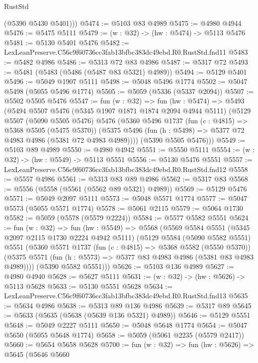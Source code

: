 \begin{lexlean}{RustStd}
\begin{coremodule}
        (@5390 @5430 @5401)))
@5474 := @5103 @83 @4989
@5475 := @4980 @4944
@5476 := @5475 @5111
@5479 := (w : @32) -> (hw : @5474) -> @5113 @5476
@5481 := @5130 @5401 @5476
@5482 := LexLeanPreserve.C56c9f60736cc3fab13bfbc383dc49ebd.R0.RustStd.fnd11
@5483 := @5482 @4986
@5486 := @5313 @72 @83 @4986
@5487 := @5317 @72
@5493 := @5481 (@5483 (@5486 (@5487 @83 @5321) @4989))
@5494 := @5129 @5401
@5496 := @5049 @1907 @5111
@5498 := @5048 @5496 @1774
@5502 := @5047 @5498 (@5055 @5496 @1774)
@5505 := @5059 (@5336 (@5337 @2094))
@5507 := @5502 @5505 @5476
@5547 := fun (w : @32) =>
  fun (hw : @5474) =>
  @5493
    (@5494
      @5507
      @5476
      (@5345 @1907 @1871 @1874 @2094 @4944 @5111)
      (@5129
        @5507
        (@5090 @5505 @5476)
        @5476
        (@5360
          @5496
          @1737
          (fun (c : @4815) => @5368 @5505 (@5475 @5370))
          (@5375 @5496 (fun (h : @5498) => @5377 @72 @4983 @4986 (@5381 @72 @4983 @4989))))
        (@5390 @5505 @5476)))
@5549 := @5103 @89 @4989
@5550 := @4980 @4942
@5551 := @5550 @5111
@5554 := (w : @32) -> (hw : @5549) -> @5113 @5551
@5556 := @5130 @5476 @5551
@5557 := LexLeanPreserve.C56c9f60736cc3fab13bfbc383dc49ebd.R0.RustStd.fnd12
@5558 := @5557 @4986
@5561 := @5313 @83 @89 @4986
@5562 := @5317 @83
@5568 := @5556 (@5558 (@5561 (@5562 @89 @5321) @4989))
@5569 := @5129 @5476
@5571 := @5049 @2097 @5111
@5573 := @5048 @5571 @1774
@5577 := @5047 @5573 (@5055 @5571 @1774)
@5578 := @5061 @2115
@5579 := @5064 @1730
@5582 := @5059 (@5578 (@5579 @2224))
@5584 := @5577 @5582 @5551
@5624 := fun (w : @32) =>
  fun (hw : @5549) =>
  @5568
    (@5569
      @5584
      @5551
      (@5345 @2097 @2115 @1730 @2224 @4942 @5111)
      (@5129
        @5584
        (@5090 @5582 @5551)
        @5551
        (@5360
          @5571
          @1737
          (fun (c : @4815) => @5368 @5582 (@5550 @5370))
          (@5375 @5571 (fun (h : @5573) => @5377 @83 @4983 @4986 (@5381 @83 @4983 @4989))))
        (@5390 @5582 @5551)))
@5626 := @5103 @136 @4989
@5627 := @4980 @4940
@5628 := @5627 @5111
@5631 := (w : @32) -> (hw : @5626) -> @5113 @5628
@5633 := @5130 @5551 @5628
@5634 := LexLeanPreserve.C56c9f60736cc3fab13bfbc383dc49ebd.R0.RustStd.fnd13
@5635 := @5634 @4986
@5638 := @5313 @89 @136 @4986
@5639 := @5317 @89
@5645 := @5633 (@5635 (@5638 (@5639 @136 @5321) @4989))
@5646 := @5129 @5551
@5648 := @5049 @2227 @5111
@5650 := @5048 @5648 @1774
@5654 := @5047 @5650 (@5055 @5648 @1774)
@5658 := @5059 (@5061 @2235 (@5579 @2417))
@5660 := @5654 @5658 @5628
@5700 := fun (w : @32) =>
  fun (hw : @5626) =>
  @5645
    (@5646
      @5660

\end{coremodule}
\end{lexlean}
